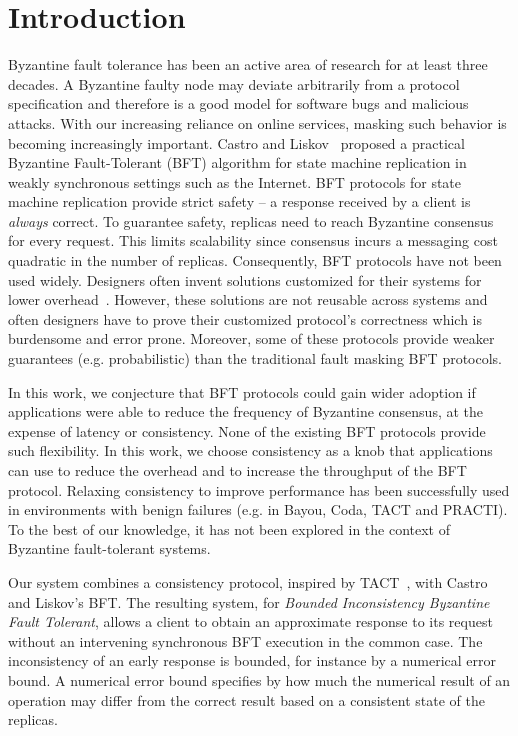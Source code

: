 \documentclass[twocolumn,10pt]{article}
\begin{document}
\section{Introduction}

Byzantine fault tolerance has been  an active area of research for at
least three decades. A Byzantine faulty node may deviate arbitrarily from a protocol
specification and therefore is a good model for software bugs and malicious attacks.
With  our increasing
reliance  on online  services, masking  such behavior  is  becoming increasingly
important.  Castro  and Liskov~\cite{Castro1999} proposed  a practical Byzantine
Fault-Tolerant  (BFT)   algorithm  for  state  machine   replication  in  weakly
synchronous settings such as the Internet. BFT  protocols for state  machine replication
provide  strict safety --  a response  received by  a client  is \textit{always}
correct.  To guarantee safety, replicas need  to reach Byzantine consensus
for every request. This limits scalability since consensus incurs a messaging
cost quadratic in the number of replicas. 
Consequently, BFT protocols
have not been used widely. Designers often invent 
solutions customized for their systems for lower overhead~\cite{Walfish2006,ppay-ccs-03,
karma-p2pecon-03,secure-routing-osdi-02,oceanstore-asplos-2000}. However, these solutions 
are not reusable across systems and often designers have to prove their customized 
protocol's correctness
which is burdensome and error prone. Moreover, some of these protocols provide weaker guarantees
(e.g. probabilistic) than the traditional fault masking BFT protocols.

In this work, we conjecture that BFT protocols  could gain wider  adoption if
applications were  able to reduce the  frequency of Byzantine  consensus, at the
expense of latency  or consistency.  None of the  existing BFT protocols provide
such flexibility.  In this work, we choose consistency as a knob that applications
can  use to  reduce  the overhead  and to  increase  the throughput  of the  BFT
protocol.   Relaxing consistency  to improve  performance has  been successfully
used  in  environments with  benign  failures (e.g.  in  Bayou,  Coda, TACT  and
PRACTI). To the best of our knowledge, it has not been explored in the context of
Byzantine fault-tolerant systems.

Our system combines a consistency protocol, inspired by TACT~\cite{Yu2002}, with
Castro  and Liskov's BFT.   The resulting  system, \Sys  for \emph{Bounded Inconsistency
Byzantine Fault Tolerant},  allows a
client to obtain  an approximate response to its  request without an intervening
synchronous BFT  execution in  the common case.   The inconsistency of  an early
response is bounded, for instance by a numerical error bound.  A numerical error
bound specifies by how much the numerical result of an operation may differ from
the correct result based on a consistent state of the replicas.
\end{document}
